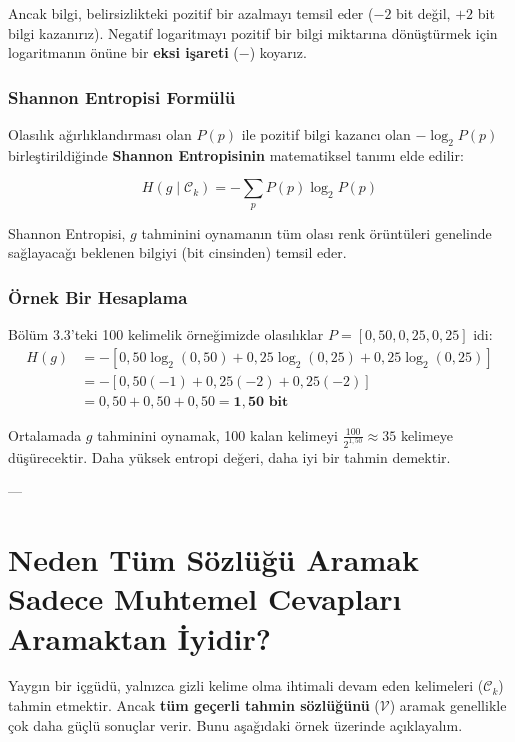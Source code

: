 \documentclass[11pt,a4paper]{article}
\begin{document}
Ancak bilgi, belirsizlikteki pozitif bir azalmayı temsil eder ($-2$ bit değil, $+2$ bit bilgi kazanırız). Negatif logaritmayı pozitif bir bilgi miktarına dönüştürmek için logaritmanın önüne bir \textbf{eksi işareti} ($-$) koyarız.

\subsubsection*{Shannon Entropisi Formülü}
Olasılık ağırlıklandırması olan $P(p)$ ile pozitif bilgi kazancı olan $-\log_2 P(p)$ birleştirildiğinde \textbf{Shannon Entropisinin} matematiksel tanımı elde edilir:

\begin{equation}
H(g \mid \mathcal{C}_k) = -\sum_{p} P(p) \log_2 P(p)
\end{equation}

Shannon Entropisi, $g$ tahminini oynamanın tüm olası renk örüntüleri genelinde sağlayacağı beklenen bilgiyi (bit cinsinden) temsil eder.

\subsubsection*{Örnek Bir Hesaplama}
Bölüm 3.3'teki 100 kelimelik örneğimizde olasılıklar $P = [0,50, 0,25, 0,25]$ idi:
\begin{align*}
H(g) &= - \left[ 0,50 \log_2(0,50) + 0,25 \log_2(0,25) + 0,25 \log_2(0,25) \right] \\
&= - \left[ 0,50(-1) + 0,25(-2) + 0,25(-2) \right] \\
&= 0,50 + 0,50 + 0,50 = \mathbf{1,50 \text{ bit}}
\end{align*}

Ortalamada $g$ tahminini oynamak, 100 kalan kelimeyi $\frac{100}{2^{1,50}} \approx 35$ kelimeye düşürecektir. Daha yüksek entropi değeri, daha iyi bir tahmin demektir.

---

\section{Neden Tüm Sözlüğü Aramak Sadece Muhtemel Cevapları Aramaktan İyidir?}

Yaygın bir içgüdü, yalnızca gizli kelime olma ihtimali devam eden kelimeleri ($\mathcal{C}_k$) tahmin etmektir. Ancak \textbf{tüm geçerli tahmin sözlüğünü} ($\mathcal{V}$) aramak genellikle çok daha güçlü sonuçlar verir. Bunu aşağıdaki örnek üzerinde açıklayalım.
\end{document}
